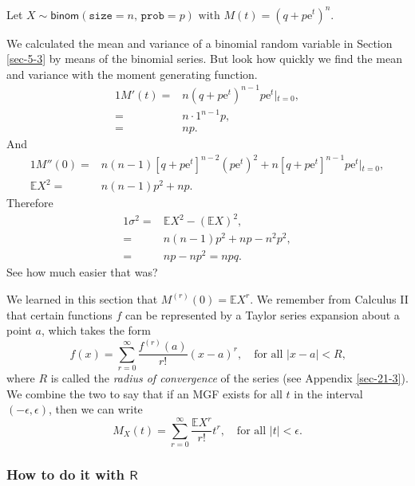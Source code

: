 \documentclass[captions=tableheading]{scrbook}
\begin{document}
\begin{example}
Let \(X\sim\mathsf{binom}(\mathtt{size}=n,\,\mathtt{prob}=p)\mbox{ with $M(t)=(q+p\mathrm{e}^{t})^{n}$}\).

We calculated the mean and variance of a binomial random variable in Section \ref{sec-5-3} by means of the binomial series. But look how quickly we find the mean and variance with the moment generating function.
\begin{alignat*}{1}
M'(t)= & n(q+p\mathrm{e}^{t})^{n-1}p\mathrm{e}^{t}\left|_{t=0}\right.,\\
= & n\cdot1^{n-1}p,\\
= & np.
\end{alignat*}
And
\begin{alignat*}{1}
M''(0)= & n(n-1)[q+p\mathrm{e}^{t}]^{n-2}(p\mathrm{e}^{t})^{2}+n[q+p\mathrm{e}^{t}]^{n-1}p\mathrm{e}^{t}\left|_{t=0}\right.,\\
\mathbb{E} X^{2}= & n(n-1)p^{2}+np.
\end{alignat*}
Therefore
\begin{alignat*}{1}
\sigma^{2}= & \mathbb{E} X^{2}-(\mathbb{E} X)^{2},\\
= & n(n-1)p^{2}+np-n^{2}p^{2},\\
= & np-np^{2}=npq.
\end{alignat*}
See how much easier that was?
\end{example}

\begin{rem}
We learned in this section that \(M^{(r)}(0)=\mathbb{E} X^{r}\). We remember from Calculus II that certain functions \(f\) can be represented by a Taylor series expansion about a point \(a\), which takes the form
\begin{equation}
f(x)=\sum_{r=0}^{\infty}\frac{f^{(r)}(a)}{r!}(x-a)^{r},\quad\mbox{for all $|x-a|<R$,}
\end{equation}
where \(R\) is called the \emph{radius of convergence} of the series (see Appendix \ref{sec-21-3}). We combine the two to say that if an MGF exists for all \(t\) in the interval \((-\epsilon,\epsilon)\), then we can write
\begin{equation}
M_{X}(t)=\sum_{r=0}^{\infty}\frac{\mathbb{E} X^{r}}{r!}t^{r},\quad\mbox{for all $|t|<\epsilon$.}
\end{equation}
\end{rem}
\subsubsection{How to do it with \(\mathsf{R}\)}
\label{sec-5-4-2-3}
\end{document}
